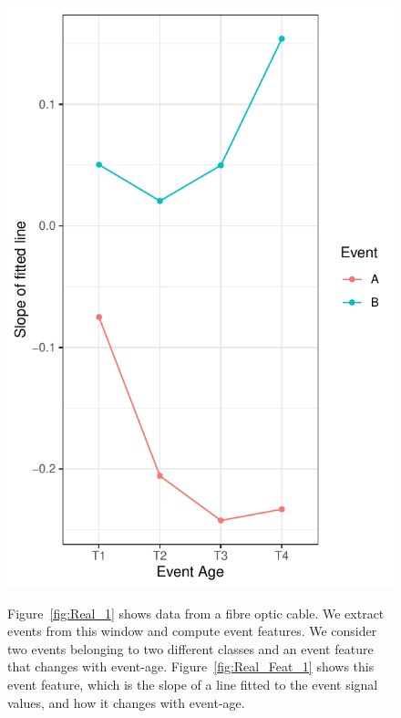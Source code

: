 \documentclass[a4paper,11pt]{article}
\begin{document}
\begin{figure}
{		\includegraphics[scale=0.8]{./Graphics/Two_Event_Features.pdf}
		\label{fig:Real_Feat_1} %
	}

	\caption{Figure~\ref{fig:Real_1} shows data from a fibre optic cable. We extract events  from this window and compute event features. We consider two events belonging to two different classes and an event feature that changes with event-age.  Figure~\ref{fig:Real_Feat_1} shows this event feature, which is the slope of a line fitted to the event signal values, and how it changes with event-age.}
	\label{fig:Real_World_Data}
\end{figure}
\end{document}
